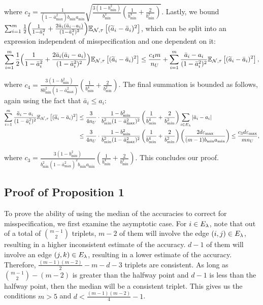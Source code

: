 where $c_2 = \frac{1}{(1 - \bar{a}_{\max}^2) b_{\min} a_{\min}} \sqrt{\frac{3(1 - b_{\min}^2)}{b_{\min}^2} \left(\frac{1}{b_{\min}^4} + \frac{2}{b_{\min}^2} \right)}$. Lastly, we bound $\sum_{i = 1}^m \frac{1}{2}\Big( \frac{1}{1 - \bar{a}_i^2} + \frac{2\bar{a}_i(\bar{a}_i - a_i)}{(1 - \bar{a}_i^2)^2}\Big) \mathbb{E}_{\mathcal{N}, \tau}\left[(\widetilde{a}_i - \bar{a}_i)^2\right]$, which can be split into an expression independent of misspecification and one dependent on it:
\begin{align}
    \sum_{i = 1}^m \frac{1}{2}\Big( \frac{1}{1 - \bar{a}_i^2} + \frac{2\bar{a}_i(\bar{a}_i - a_i)}{(1 - \bar{a}_i^2)^2}\Big) \mathbb{E}_{\mathcal{N}, \tau}\left[(\widetilde{a}_i - \bar{a}_i)^2\right] \le \frac{c_4 m}{n_U} + \sum_{i = 1}^m \frac{\bar{a}_i - a_i}{(1 - \bar{a}_i^2)^2} \mathbb{E}_{\mathcal{N}, \tau}\left[(\widetilde{a}_i - \bar{a}_i)^2\right],
\end{align}

where $c_4 = \frac{3(1 - b_{\min}^2)}{8b_{\min}^2 (1 - \bar{a}_{\max}^2)} \left(\frac{1}{b_{\min}^4} + \frac{2}{b_{\min}^2} \right)$. The final summation is bounded as follows, again using the fact that $\bar{a}_i \le a_i$:
\begin{align}
    \sum_{i = 1}^m \frac{\bar{a}_i - a_i}{(1 - \bar{a}_i^2)^2} \mathbb{E}_{\mathcal{N}, \tau}\left[(\widetilde{a}_i - \bar{a}_i)^2\right] &\le \frac{3}{4 n_U} \cdot \frac{1 - b_{\min}^2}{b_{\min}^2 (1 - \bar{a}_{\max}^2)^2} \left(\frac{1}{b_{\min}^4} + \frac{2}{b_{\min}^2} \right) \sum_{i \in E_{\lambda}} |\bar{a}_i - a_i | \\
    &\le \frac{3}{4 n_U} \cdot \frac{1 - b_{\min}^2}{b_{\min}^2 (1 - \bar{a}_{\max}^2)^2} \left(\frac{1}{b_{\min}^4} + \frac{2}{b_{\min}^2} \right) \left(\frac{2d \varepsilon_{\max}}{(m - 1) b_{\min} a_{\min}}\right) \le \frac{c_3 d \varepsilon_{\max}}{m n_U},
\end{align}

where $c_3 = \frac{3(1 - b_{\min}^2)}{b_{\min}^2 (1 - \bar{a}_{\max}^2)^2 b_{\min} a_{\min}} \left(\frac{1}{b_{\min}^4} + \frac{2}{b_{\min}^2} \right)$. This concludes our proof.

\subsection{Proof of Proposition 1}

To prove the ability of using the median of the accuracies to correct for misspecification, we first examine the asymptotic case. For $i \in E_{\lambda}$, note that out of a total of ${m - 1 \choose 2}$ triplets, $m - 2$ of them will involve the edge $(i, j)\in E_{\lambda}$, resulting in a higher inconsistent estimate of the accuracy. $d - 1$ of them will involve an edge $(j, k) \in E_{\lambda}$, resulting in a lower estimate of the accuracy. Therefore, $\frac{(m - 1)(m - 2)}{2} - m - d - 3$ triplets are consistent. As long as ${m - 1 \choose 2} - (m - 2)$ is greater than the halfway point and $d - 1$ is less than the halfway point, then the median will be a consistent triplet. This gives us the conditions $m > 5$ and $d < \frac{(m - 1)(m - 2)}{4} - 1$.

